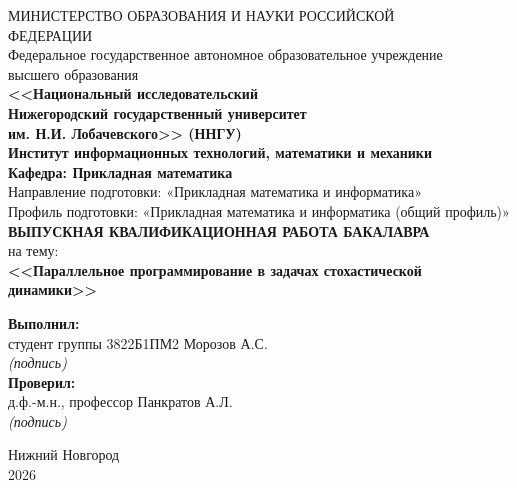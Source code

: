 \begin{center} %
МИНИСТЕРСТВО ОБРАЗОВАНИЯ И НАУКИ РОССИЙСКОЙ \\
ФЕДЕРАЦИИ \\
Федеральное государственное автономное образовательное учреждение  \\
высшего образования\\ \textbf{<<Национальный исследовательский \\ Нижегородский государственный университет \\
им. Н.И. Лобачевского>> (ННГУ)}\\[1.5cm]%
\textbf{Институт информационных технологий, математики и механики}\\[0.6cm]
\textbf{Кафедра: Прикладная математика}\\[0.6cm]
Направление подготовки: «Прикладная математика и информатика»\\
Профиль подготовки: «Прикладная математика и информатика (общий профиль)»\\[4.5cm]

 \textbf{\large ВЫПУСКНАЯ КВАЛИФИКАЦИОННАЯ РАБОТА БАКАЛАВРА
} \\[0.3cm] %
 
 на тему:\\
  \textbf{\large <<Параллельное программирование в задачах стохастической динамики>>}\\[5.5cm]
\begin{flushright}
 \begin{minipage}{0.52\textwidth} %
 \begin{flushleft} %
  \textbf{Выполнил:} \\
 студент группы 3822Б1ПМ2 Морозов А.С.\\
  \underline{\hspace{4cm}} \textit{(подпись)} \\[0.3cm]
  \textbf{Проверил:}\\
    д.ф.-м.н., профессор Панкратов А.Л.\\
  \underline{\hspace{4cm}} \textit{(подпись)} \\[0.5cm]
 \end{flushleft} %
 \end{minipage} %
\end{flushright}
 \vfill %

  Нижний Новгород \\
 2026

 \thispagestyle{empty} %

\end{center}